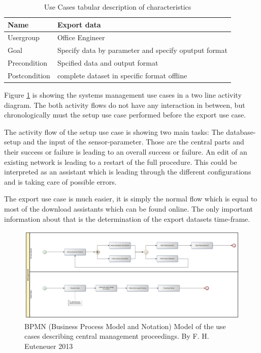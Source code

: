 \begin{table}[H]
\centering
\begin{tabular}{l | p{11cm}}
Name & Export data\\ \hline 
Usergroup & Office Engineer\\ \hline 
Goal & Specify data by parameter and specify oputput format\\ \hline 
Precondition & Spcified data and output format\\ \hline 
Postcondition & complete dataset in specific format offline\\ 
\end{tabular}
\caption{Use Cases tabular description of characteristics} 
\label{table:use case description of "Export data"}
\end{table}

Figure \ref{fig:bpmn_use-case_management} is showing the systems management use cases in a two line activity diagram. The both activity flows do not have any interaction in between, but chronologically must the setup use case performed before the export use case.

The activity flow of the setup use case is showing two main tasks: The database-setup and the input of the sensor-parameter. Those are the central parts and their success or failure is leading to an overall success or failure. An edit of an existing network is leading to a restart of the full procedure. This could be interpreted as an assistant which is leading through the different configurations and is taking care of possible errors.

The export use case is much easier, it is simply the normal flow which is equal to most of the download assistants which can be found online. The only important information about that is the determination of the export datasets time-frame.

\begin{figure}[H]
	\centering
 	 \includegraphics[scale=0.24]{graphics/bpmn_use-cases_management.jpg} 
	\caption{BPMN (Business Process Model and Notation) Model of the use cases describing central management proceedings. By F. H. Euteneuer 2013}
	 \label{fig:bpmn_use-case_management}
\end{figure}


